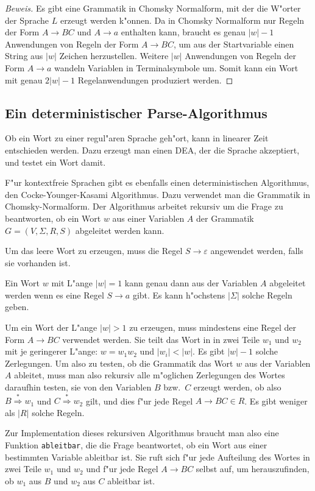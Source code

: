 \begin{proof}[Beweis]
Es gibt eine Grammatik in Chomsky Normalform, mit der die W"orter
der Sprache $L$ erzeugt werden k"onnen.
Da in Chomsky Normalform nur Regeln der Form $A\to BC$ und $A\to a$
enthalten kann, braucht es genau $|w|-1$ Anwendungen von Regeln der Form
$A\to BC$, um aus der Startvariable einen String aus $|w|$ Zeichen
herzustellen. Weitere $|w|$ Anwendungen von Regeln der Form $A\to a$
wandeln Variablen in Terminalsymbole um. Somit kann ein Wort mit
genau $2|w|-1$ Regelanwendungen produziert werden.
\end{proof}


\subsection{Ein deterministischer Parse-Algorithmus}
Ob ein Wort zu einer regul"aren Sprache geh"ort, kann in linearer
Zeit entschieden werden. Dazu erzeugt man einen DEA, der die Sprache
akzeptiert, und testet ein Wort damit.

F"ur kontextfreie Sprachen gibt es ebenfalls einen deterministischen
Algorithmus, den Cocke-Younger-Kasami Algorithmus. Dazu verwendet
man die Grammatik in Chomsky-Normalform. Der Algorithmus arbeitet
rekursiv um die Frage zu beantworten, ob ein Wort $w$ aus einer
Variablen $A$ der Grammatik $G=(V,\Sigma,R,S)$  abgeleitet
werden kann.

Um das leere Wort zu erzeugen, muss die Regel $S\to\varepsilon$
angewendet werden, falls sie vorhanden ist.

Ein Wort $w$ mit L"ange $|w|=1$ kann genau dann aus der Variablen 
$A$ abgeleitet werden wenn es eine Regel $S\to a$ gibt. 
Es kann h"ochstens $|\Sigma|$ solche Regeln geben.

Um ein Wort der L"ange $|w|>1$ zu erzeugen, muss mindestens eine
Regel der Form
$A\to BC$ verwendet werden. Sie teilt das Wort in in zwei Teile
$w_1$ und $w_2$ mit je geringerer L"ange: $w=w_1w_2$ und 
$|w_i|<|w|$. Es gibt $|w|-1$ solche Zerlegungen. Um also zu testen,
ob die Grammatik das Wort $w$ aus der Variablen $A$ ableitet,
muss man also rekursiv alle m"oglichen
Zerlegungen des Wortes daraufhin testen, sie von den Variablen
$B$ bzw.~$C$ erzeugt werden, ob also $B\overset{*}\Rightarrow w_1$
und $C\overset{*}\Rightarrow w_2$ gilt, und dies f"ur jede
Regel $A\to BC\in R$. Es gibt weniger als $|R|$ solche Regeln.

Zur Implementation dieses rekursiven Algorithmus braucht man
also eine Funktion {\tt ableitbar}, die die Frage beantwortet,
ob ein Wort aus einer bestimmten Variable ableitbar ist. Sie
ruft sich f"ur jede Aufteilung des Wortes in zwei Teile
$w_1$ und $w_2$ und f"ur jede Regel $A\to BC$ selbst auf, um
herauszufinden, ob $w_1$ aus $B$ und $w_2$ aus $C$ ableitbar ist.

